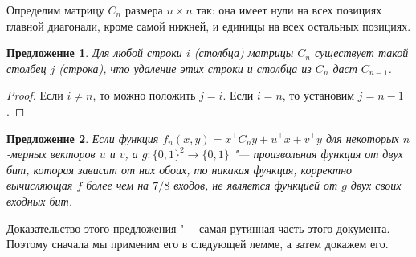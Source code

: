 \documentclass[oneside, a4paper]{article}
\newtheorem{proposition}{Предложение}
\begin{document}
\title{}
\author{Олейников Иван}
\date{\today}
\maketitle

Определим матрицу $C_n$ размера $n \times n$ так: она имеет нули на всех
позициях главной диагонали, кроме самой нижней, и единицы на всех остальных
позициях.

\begin{proposition} \label{easy}
Для любой строки $i$ (столбца) матрицы $C_n$ существует такой столбец $j$
(строка), что удаление этих строки и столбца из $C_n$ даст $C_{n-1}$.
\end{proposition}
\begin{proof}
Если $i \neq n$, то можно положить $j = i$. Если $i = n$, то установим $j = n - 1$.
\end{proof}

\begin{proposition} \label{tough}
Если функция $f_n(x, y) = x^\top C_n y + u^\top x + v^\top y$ для некоторых
$n$-мерных векторов $u$ и $v$, а $g : \{0, 1\}^2 \to \{0, 1\}$ "---
произвольная функция от двух бит, которая зависит от них обоих, то никакая функция,
корректно вычисляющая $f$
более чем на $7/8$ входов, не является функцией от $g$ двух своих входных бит.
\end{proposition}

Доказательство этого предложения "--- самая рутинная часть этого документа. Поэтому
сначала мы применим его в следующей лемме, а затем докажем его.
\end{document}
